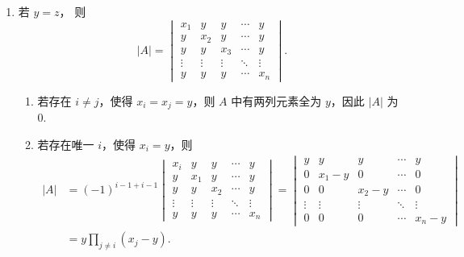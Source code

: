 \documentclass[12pt,fontset=fandol]{ctexart}
\begin{document}
\begin{solve}
\begin{enumerate}
                \item 若 $y = z$，
                    则
                    \[
                        |A| = \begin{vmatrix}
                            x_1    & y      & y      & \cdots & y      \\
                            y      & x_2    & y      & \cdots & y      \\
                            y      & y      & x_3    & \cdots & y      \\
                            \vdots & \vdots & \vdots & \ddots & \vdots \\
                            y      & y      & y      & \cdots & x_n
                        \end{vmatrix}.
                    \]

                    \begin{enumerate}
                        \item 若存在 $i \neq j$，使得 $x_i = x_j = y$，则 $A$ 中有两列元素全为 $y$，因此 $|A|$ 为 $0$.

                        \item 若存在唯一 $i$，使得 $x_i = y$，则
                            \begin{align*}
                                |A| &= (-1)^{i - 1 + i - 1} \begin{vmatrix}
                                    x_i    & y      & y      & \cdots & y      \\
                                    y      & x_1    & y      & \cdots & y      \\
                                    y      & y      & x_2    & \cdots & y      \\
                                    \vdots & \vdots & \vdots & \ddots & \vdots \\
                                    y      & y      & y      & \cdots & x_n
                                \end{vmatrix}
                                = \begin{vmatrix}
                                    y      & y       & y       & \cdots & y       \\
                                    0      & x_1 - y & 0       & \cdots & 0       \\
                                    0      & 0       & x_2 - y & \cdots & 0       \\
                                    \vdots & \vdots  & \vdots  & \ddots & \vdots  \\
                                    0      & 0       & 0       & \cdots & x_n - y
                                \end{vmatrix} \\
                                &= y \prod_{j \neq i} (x_j - y).
                            \end{align*}


\end{enumerate}
\end{enumerate}
\end{solve}
\end{document}
